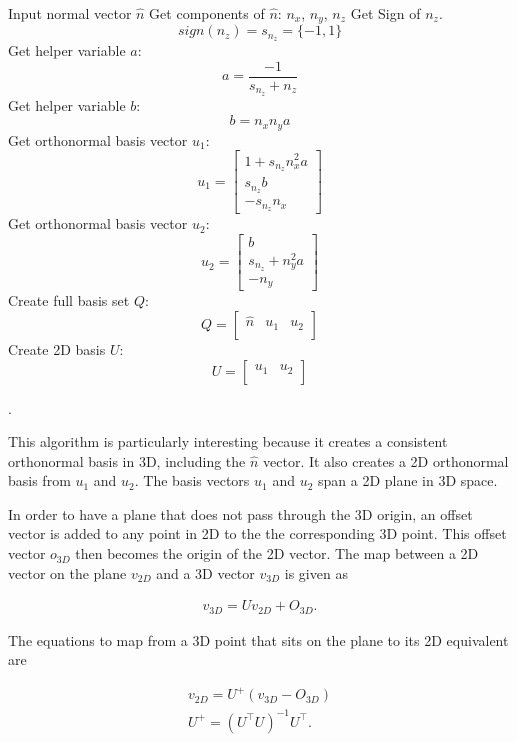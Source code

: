 \begin{algorithm}
\caption{Orthonormal Basis Creation}
\begin{algorithmic}[1]
\State Input normal vector $\hat{n}$
\State Get components of $\hat{n}$: $n_x$, $n_y$, $n_z$
\State Get Sign of $n_z$. $$sign(n_z) = s_{n_z} = \{-1,1\}$$
\State Get helper variable $a$: $$a = \frac{-1}{s_{n_z} + n_z}$$
\State Get helper variable $b$: $$b = n_x n_y a$$
\State Get orthonormal basis vector $u_1$: 
$$u_1 = 
\begin{bmatrix}
    1 + s_{n_z} n_x^2 a\\
    s_{n_z} b\\
    -s_{n_z} n_x
\end{bmatrix}$$
\State Get orthonormal basis vector $u_2$:
$$u_2 =
\begin{bmatrix}
    b\\
    s_{n_z} + n_y^2 a\\
    -n_y
\end{bmatrix}
$$
\State Create full basis set $Q$:
$$
Q = 
\begin{bmatrix}
    \hat{n} & u_1 & u_2\\
\end{bmatrix}
$$
\State Create 2D basis $U$:
$$
U = 
\begin{bmatrix}
    u_1 & u_2\\
\end{bmatrix}
$$
\end{algorithmic}
\end{algorithm}.

This algorithm is particularly interesting because it creates a consistent orthonormal basis in 3D, including the $\hat{n}$ vector. 
It also creates a 2D orthonormal basis from $u_1$ and $u_2$. 
The basis vectors $u_1$ and $u_2$ span a 2D plane in 3D space.

In order to have a plane that does not pass through the 3D origin, an offset vector is added to any point in 2D to the the corresponding 3D point. 
This offset vector $o_{3D}$ then becomes the origin of the 2D vector. 
The map between a 2D vector on the plane $v_{2D}$ and a 3D vector $v_{3D}$ is given as

\begin{align}
    v_{3D} = U v_{2D} + O_{3D}
    .
\end{align}

The equations to map from a 3D point that sits on the plane to its 2D equivalent are

\begin{align}
    v_{2D} = U^+ (v_{3D} - O_{3D})\\
    U^+ = (U^\top U)^{-1} U^\top
    .
\end{align}

